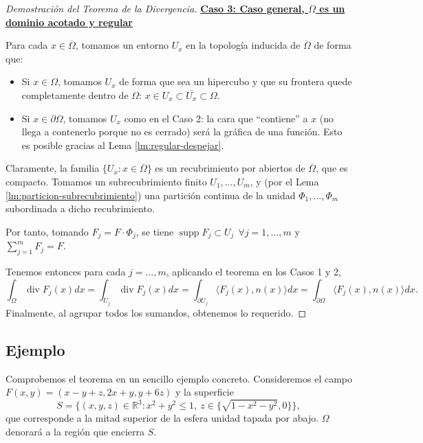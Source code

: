 \documentclass[12pt,spanish]{article}
\theoremstyle{definition}
\theoremstyle{remark}
\begin{document}
\begin{proof}[Demostración del Teorema de la Divergencia]
	
	\underline{\textbf{Caso 3: Caso general, $\Omega$ es un dominio acotado y regular}}
	
	Para cada $x\in\overline{\Omega}$, tomamos un entorno $U_x$ en la topología inducida de $\overline{\Omega}$ de forma que:
	\begin{itemize}
		\item Si $x\in\Omega$, tomamos $U_x$ de forma que sea un hipercubo y que su frontera quede completamente dentro de $\Omega$: $x\in U_x\subset\overline{U_x}\subset\Omega$.
		\item Si $x\in\partial\Omega$, tomamos $U_x$ como en el Caso 2: la cara que ``contiene'' a $x$ (no llega a contenerlo porque no es cerrado) será la gráfica de una función. Esto es posible gracias al Lema \ref{lm:regular-despejar}.
	\end{itemize}
Claramente, la familia $\{U_x:x\in\overline{\Omega}\}$ es un recubrimiento por abiertos de $\overline{\Omega}$, que es compacto. Tomamos un subrecubrimiento finito $U_1,\ldots, U_m$, y (por el Lema \ref{lm:particion-subrecubrimiento}) una partición continua de la unidad $\Phi_1,\ldots,\Phi_m$ subordinada a dicho recubrimiento.

Por tanto, tomando $F_j=F\cdot \Phi_j$, se tiene $\operatorname{supp}F_j\subset U_j\ \ \forall j=1,\ldots,m$ y $\sum\limits_{j=1}^m F_j=F$.

Tenemos entonces para cada $j=\ldots,m$, aplicando el teorema en los Casos 1 y 2,
\[\int_\Omega\operatorname{div} F_j(x)dx=\int_{U_j}\operatorname{div} F_j(x)dx=\int_{\partial U_j}\langle F_j(x),n(x) \rangle dx=\int_{\partial\Omega}\langle F_j(x),n(x) \rangle dx.\] %
Finalmente, al agrupar todos los sumandos, obtenemos lo requerido.
\end{proof}

\subsection*{Ejemplo}

Comprobemos el teorema en un sencillo ejemplo concreto. Consideremos el campo $F(x,y)=(x-y+z,2x+y,y+6z)$ y la superficie \[S=\big\{(x,y,z)\in\mathbb{R}^3: x^2+y^2\leq 1, \  z\in\{\sqrt{1-x^2-y^2},0\}\big\},\]
que corresponde a la mitad superior de la esfera unidad tapada por abajo. $\Omega$ denorará a la región que encierra $S$.
\end{document}
